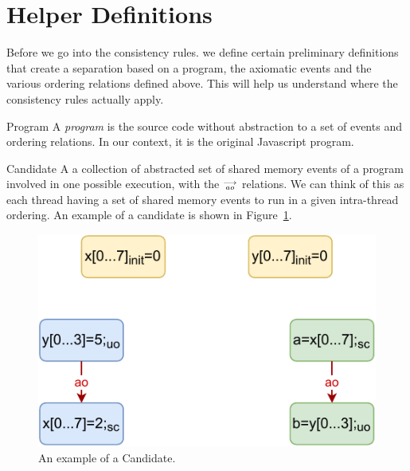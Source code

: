 \section{Helper Definitions}
    
    Before we go into the consistency rules. we define certain preliminary definitions that create a separation based on a program, the axiomatic events and the various ordering relations defined above. This will help us understand where the consistency rules actually apply.    
    
    \begin{definition}{Program} 
        A \emph{program} is the source code without abstraction to a set of events and ordering relations. In our context, it is the original Javascript program. 
        
    \end{definition}
    
    \begin{definition}{Candidate}
        A a collection of abstracted set of shared memory events of a program involved in one possible execution, with the $\stackrel{\longrightarrow}{_\textit{ao}}$ relations. We can think of this as each thread having a set of shared memory events to run in a given intra-thread ordering. An example of a candidate is shown in Figure~\ref{model:candidate}.
        
        \begin{figure}[H]
            \centering
            \includegraphics[scale=0.7]{4.ECMAScriptMemoryModel/candidate.pdf}
            \caption{An example of a Candidate.}
            \label{model:candidate}
        \end{figure}
        
    \end{definition}

